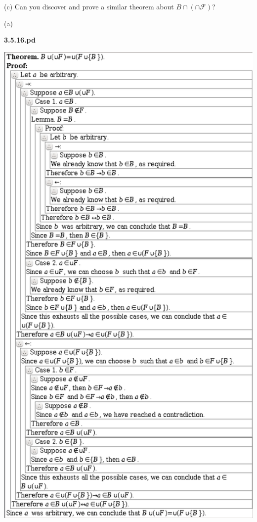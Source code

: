 \documentclass{article}
\begin{document}
\hspace{12pt}(c) Can you discover and prove a similar theorem about $B \cap (\cap \mathcal{F} )$?

\vspace{30pt}

(a)

\textbf{3.5.16.pd}
\vspace{10pt}

\includegraphics[scale=0.15]{3_5_16}
\end{document}
